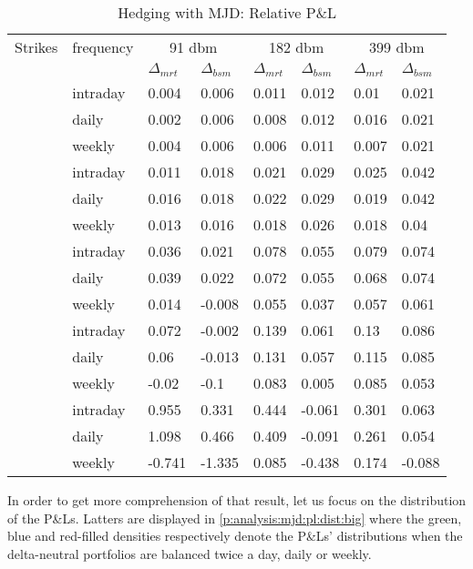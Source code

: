 \documentclass[12pt]{report}
\begin{document}
\begin{table}[h]
\centering
\begin{tabular}{llllllll}
  \hline
  \hline
 Strikes & frequency  &\multicolumn{2}{c}{91 dbm} & \multicolumn{2}{c}{182 dbm} & \multicolumn{2}{c}{399 dbm} \\ 
   &  & $\Delta_{mrt}$ & $\Delta_{bsm}$ & $\Delta_{mrt}$ & $\Delta_{bsm}$ & $\Delta_{mrt}$ & $\Delta_{bsm}$ \\ 
   \hdashline
  \multirow{3}{*}{140} & intraday & 0.004 & 0.006 & 0.011 & 0.012 & 0.01 & 0.021 \\ 
  & daily & 0.002 & 0.006 & 0.008 & 0.012 & 0.016 & 0.021 \\ 
  & weekly & 0.004 & 0.006 & 0.006 & 0.011 & 0.007 & 0.021 \\ 
   \hdashline
  \multirow{3}{*}{160} & intraday & 0.011 & 0.018 & 0.021 & 0.029 & 0.025 & 0.042 \\ 
  & daily & 0.016 & 0.018 & 0.022 & 0.029 & 0.019 & 0.042 \\ 
  & weekly & 0.013 & 0.016 & 0.018 & 0.026 & 0.018 & 0.04 \\ 
   \hdashline
  \multirow{3}{*}{186} & intraday & 0.036 & 0.021 & 0.078 & 0.055 & 0.079 & 0.074 \\ 
  & daily & 0.039 & 0.022 & 0.072 & 0.055 & 0.068 & 0.074 \\ 
  & weekly & 0.014 & -0.008 & 0.055 & 0.037 & 0.057 & 0.061 \\ 
   \hdashline
  \multirow{3}{*}{200} & intraday & 0.072 & -0.002 & 0.139 & 0.061 & 0.13 & 0.086 \\ 
  & daily & 0.06 & -0.013 & 0.131 & 0.057 & 0.115 & 0.085 \\ 
  & weekly & -0.02 & -0.1 & 0.083 & 0.005 & 0.085 & 0.053 \\ 
   \hdashline
  \multirow{3}{*}{230} & intraday & 0.955 & 0.331 & 0.444 & -0.061 & 0.301 & 0.063 \\ 
  & daily & 1.098 & 0.466 & 0.409 & -0.091 & 0.261 & 0.054 \\ 
  & weekly & -0.741 & -1.335 & 0.085 & -0.438 & 0.174 & -0.088 \\ 
   \hline
\end{tabular}
\caption{Hedging with MJD: Relative P\&L} 
\label{t:analysis:merton:pl}
\end{table}



In order to get more comprehension of that result, let us focus on the distribution of the P\&Ls. Latters are displayed in \cref{p:analysis:mjd:pl:dist:big} where the green, blue and red-filled densities respectively denote the P\&Ls' distributions when the delta-neutral portfolios are balanced twice a day, daily or weekly.
\end{document}

